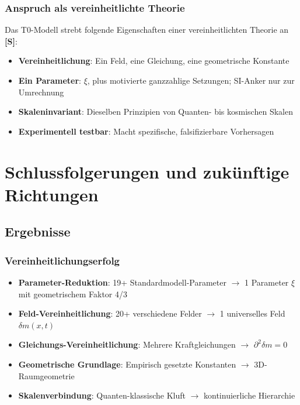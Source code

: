 	\subsubsection{Anspruch als vereinheitlichte Theorie}
	\label{subsubsec:toe_kandidat}
	
	Das T0-Modell strebt folgende Eigenschaften einer vereinheitlichten Theorie an \textbf{[S]}:
	\begin{itemize}
		\item \textbf{Vereinheitlichung}: Ein Feld, eine Gleichung, eine geometrische Konstante
		\item \textbf{Ein Parameter}: $\xi$, plus motivierte ganzzahlige Setzungen; SI-Anker nur zur Umrechnung
		\item \textbf{Skaleninvariant}: Dieselben Prinzipien von Quanten- bis kosmischen Skalen
		\item \textbf{Experimentell testbar}: Macht spezifische, falsifizierbare Vorhersagen
	\end{itemize}
	
	\section{Schlussfolgerungen und zukünftige Richtungen}
	\label{sec:schlussfolgerungen}
	
	\subsection{Ergebnisse}
	\label{subsec:revolutionaere_errungenschaften}
	
	\subsubsection{Vereinheitlichungserfolg}
	\label{subsubsec:vereinheitlichungserfolg}
	
	\begin{tcolorbox}[colback=yellow!10!white,colframe=orange!75!black,title=T0-Theorie: zentrale Ergebnisse]
		\begin{itemize}
			\item \textbf{Parameter-Reduktion}: 19+ Standardmodell-Parameter $\rightarrow$ 1 Parameter $\xi$ mit geometrischem Faktor 4/3
			\item \textbf{Feld-Vereinheitlichung}: 20+ verschiedene Felder $\rightarrow$ 1 universelles Feld $\delta m(x,t)$
			\item \textbf{Gleichungs-Vereinheitlichung}: Mehrere Kraftgleichungen $\rightarrow$ $\partial^2\delta m = 0$
			\item \textbf{Geometrische Grundlage}: Empirisch gesetzte Konstanten $\rightarrow$ 3D-Raumgeometrie
			\item \textbf{Skalenverbindung}: Quanten-klassische Kluft $\rightarrow$ kontinuierliche Hierarchie
		\end{itemize}
	\end{tcolorbox}
	
